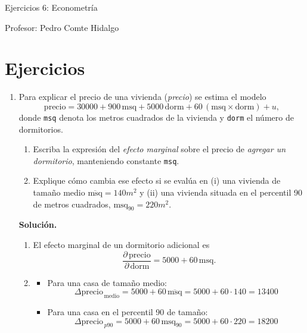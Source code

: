 \documentclass[10pt,a4paper]{article}
\begin{document}
\vspace{5cm}

\begin{center}
    {\Large  Ejercicios 6: Econometría }

Profesor:    Pedro Comte Hidalgo
\end{center}



\section{Ejercicios}
\begin{enumerate}

\item Para explicar el precio de una vivienda (\emph{precio}) se estima el modelo
        \[
          \text{precio}
          = 30000
          + 900\,\text{msq}
          + 5000\,\text{dorm}
          + 60\,(\text{msq}\times\text{dorm})
          + u ,
        \]
        donde \texttt{msq} denota los metros cuadrados de la vivienda y
        \texttt{dorm} el número de dormitorios.

        \begin{enumerate}[label=\alph*)]
          \item Escriba la expresión del \emph{efecto marginal} sobre el precio de
                \emph{agregar un dormitorio}, manteniendo constante \texttt{msq}.
          \item Explique cómo cambia ese efecto si se evalúa en (i) una vivienda de
                tamaño medio $\overline{\text{msq}}=140m^2$ y (ii) una vivienda situada
                en el percentil 90 de metros cuadrados, $\text{msq}_{90}=220m^2$.
        \end{enumerate}

        \textbf{Solución.}
        \begin{enumerate}[label=\alph*)]
          \item El efecto marginal de un dormitorio adicional es
                \[
                  \frac{\partial\,\text{precio}}{\partial\,\text{dorm}}
                  = 5000 + 60\,\text{msq}.
                \]
          \item \begin{itemize}
                  \item Para una casa de tamaño medio:
                        \[
                          \Delta\text{precio}_{\,\text{medio}}
                          = 5000 + 60\,\overline{\text{msq}}=5000+60\cdot 140 = 13400
                        \]
                  \item Para una casa en el percentil 90 de tamaño:
                        \[
                          \Delta\text{precio}_{\,p90}
                          = 5000 + 60\,\text{msq}_{90}=5000+60\cdot 220=18200
                        \]
                \end{itemize}
        \end{enumerate}



\end{enumerate}
\end{document}
